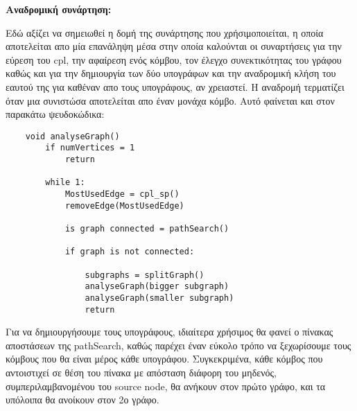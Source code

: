 \documentclass{article}
\begin{document}
\textbf{Αναδρομική συνάρτηση:}\bigbreak

Εδώ αξίζει να σημειωθεί η δομή της συνάρτησης που χρήσιμοποιείται, η οποία αποτελείται απο μία επανάληψη μέσα στην οποία καλούνται οι συναρτήσεις για την εύρεση του
cpl, την αφαίρεση ενός κόμβου, τον έλεγχο συνεκτικότητας του γράφου καθώς και για την δημιουργία των δύο υπογράφων και
την αναδρομική κλήση του εαυτού της για καθέναν απο τους υπογράφους, αν χρειαστεί. Η αναδρομή τερματίζει όταν μια συνιστώσα αποτελείται απο έναν μονάχα κόμβο.
Αυτό φαίνεται και στον παρακάτω ψευδοκώδικα:\bigbreak

\begin{lstlisting}
	void analyseGraph()
		if numVertices = 1	
			return
		
		while 1:
			MostUsedEdge = cpl_sp()
			removeEdge(MostUsedEdge)
			
			is graph connected = pathSearch()
	
			if graph is not connected:

				subgraphs = splitGraph()
				analyseGraph(bigger subgraph)								
				analyseGraph(smaller subgraph)				
				return
\end{lstlisting}\bigbreak{}

Για να δημιουργήσουμε τους υπογράφους, ιδιαίτερα χρήσιμος θα φανεί ο πίνακας αποστάσεων της pathSearch,
καθώς παρέχει έναν εύκολο τρόπο να ξεχωρίσουμε τους κόμβους που θα είναι μέρος κάθε υπογράφου. Συγκεκριμένα, κάθε κόμβος που αντοιστιχεί σε θέση του πίνακα
με απόσταση διάφορη του μηδενός, συμπεριλαμβανομένου του source node, θα ανήκουν στον πρώτο γράφο, και τα 
υπόλοιπα θα ανοίκουν στον 2ο γράφο.
\end{document}
